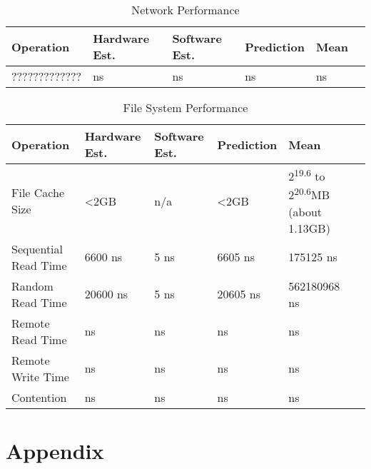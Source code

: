 \documentclass{article} %
\begin{document}
\begin{table}[!htbp]
  \caption{Network Performance}
  \begin{tabular}{|l|l|l|l|l|l|}
    \hline
    Operation               & Hardware Est.         & Software Est.         & Prediction            & Mean     \\ \hline
    ?????????????           & ns                    & ns                    & ns                    & ns\\ \hline
  \end{tabular}
  \label{table:overview_network}
\end{table}

\begin{table}[!htbp]
  \caption{File System Performance}
  \begin{tabular}{|l|l|l|l|l|l|}
    \hline
    Operation               & Hardware Est.         & Software Est.         & Prediction            & Mean     \\ \hline
    File Cache Size         & \textless2GB          & n/a                   & \textless2GB          & 2\textsuperscript{19.6} to 2\textsuperscript{20.6}MB (about 1.13GB)\\ \hline
    Sequential Read Time    & 6600 ns               & 5 ns                  & 6605 ns               & 175125 ns\\ \hline
    Random Read Time        & 20600 ns              & 5 ns                  & 20605 ns              & 562180968 ns\\ \hline
    Remote Read Time        & ns                    & ns                    & ns                    & ns\\ \hline
    Remote Write Time       & ns                    & ns                    & ns                    & ns\\ \hline
    Contention              & ns                    & ns                    & ns                    & ns\\ \hline
  \end{tabular}
  \label{table:overview_file}
\end{table}

\section{Appendix}
\end{document}
